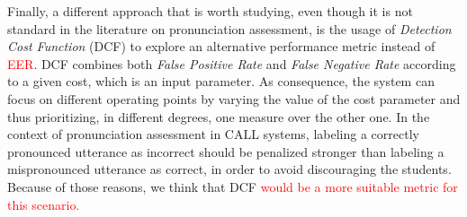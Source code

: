Finally, a different approach
that is worth studying, even though it is not standard in the literature
on pronunciation assessment,
is the usage of \textit{Detection Cost Function} (DCF) %
to explore an alternative performance metric
instead of \textcolor{red}{EER}.
DCF combines both \textit{False Positive Rate} and \textit{False Negative Rate}
according to a given cost, which is an input parameter.
As consequence, the system can focus on different operating points
by varying the value of the cost parameter and thus prioritizing,
in different degrees, one measure over the other one.
In the context of pronunciation assessment in
CALL systems, labeling a correctly pronounced utterance as incorrect should be
penalized stronger than labeling a mispronounced utterance as correct, in order
to avoid discouraging the students. Because of those reasons,
we think that DCF
\textcolor{red}{would be a more suitable metric for this scenario.}
